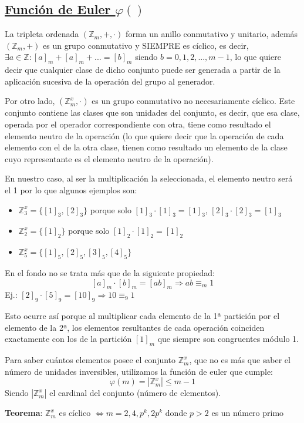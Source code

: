\documentclass[10pt,a4paper,openright]{book}
\begin{document}
\subsection*{\underline{Función de Euler $\varphi ()$}}
La tripleta ordenada $(\mathbb Z_m,+,\cdot)$ forma un anillo conmutativo y unitario, además $(\mathbb Z_m, +)$ es un grupo conmutativo y SIEMPRE es cíclico, es decir, $\exists a\in \mathbb Z : [a]_m+[a]_m+...=[b]_m$ siendo $b=0,1,2,...,m-1$, lo que quiere decir que cualquier clase de dicho conjunto puede ser generada a partir de la aplicación sucesiva de la operación del grupo al generador.\par
Por otro lado, $(\mathbb Z_m^x, \cdot)$ es un grupo conmutativo no necesariamente cíclico. Este conjunto contiene las clases que son unidades del conjunto, es decir, que esa clase, operada por el operador correspondiente con otra, tiene como resultado el elemento neutro de la operación (lo que quiere decir que la operación de cada elemento con el de la otra clase, tienen como resultado un elemento de la clase cuyo representante es el elemento neutro de la operación).\par
En nuestro caso, al ser la multiplicación la seleccionada, el elemento neutro será el 1 por lo que algunos ejemplos son:
\begin{itemize}
\item $\mathbb Z_3^x=\{[1]_3, [2]_3\}$ porque solo $[1]_3\cdot[1]_3=[1]_3$, $[2]_3\cdot[2]_3=[1]_3 $
\item $\mathbb Z_2^x=\{\left[1\right]_2\}$ porque solo $[1]_2\cdot [1]_2=[1]_2$
\item $\mathbb Z_5^x=\{[1]_5, [2]_5, [3]_5, [4]_5\}$
\end{itemize}
En el fondo no se trata más que de la siguiente propiedad:
$$[a]_m\cdot[b]_m=[ab]_m \Rightarrow ab\equiv_m 1$$
Ej.: $[2]_9\cdot[5]_9=[10]_9\Rightarrow 10\equiv_9 1$\par
Esto ocurre así porque al multiplicar cada elemento de la 1ª partición por el elemento de la 2ª, los elementos resultantes de cada operación coinciden exactamente con los de la partición $[1]_m$ que siempre son congruentes módulo 1.\par
Para saber cuántos elementos posee el conjunto $\mathbb Z_m^x$, que no es más que saber el número de unidades inversibles, utilizamos la función de euler que cumple:
$$\varphi (m)=|\mathbb Z_m^x|\leq m-1$$
Siendo $|\mathbb Z_m^x|$ el cardinal del conjunto (número de elementos).

\textbf{Teorema}: $\mathbb Z_m^x$ es cíclico $\Leftrightarrow m=2,4,p^k, 2p^k$ donde $p>2$ es un número primo
\end{document}
